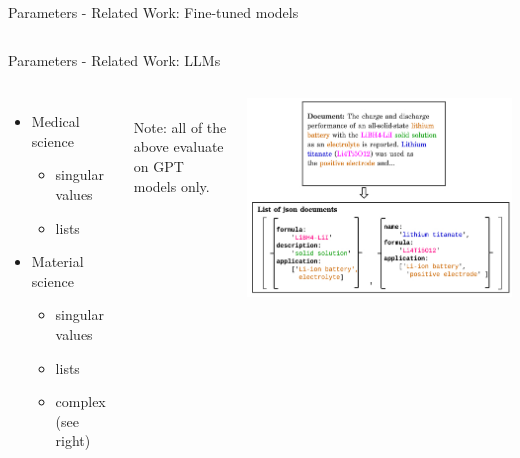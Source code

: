 \documentclass[en,16:9,smallfoot]{sdqbeamer}
\begin{document}
\begin{frame}{Parameters - Related Work: Fine-tuned models}
\begin{columns}
   \end{columns}
   \end{frame}

   \begin{frame}{Parameters - Related Work: LLMs}
   \begin{columns}
           \begin{itemize}
               \item Medical science~\cite{Agrawal2022}
                   \begin{itemize}
                       \item singular values
                       \item lists
                   \end{itemize}
               \item Material science~\cite{Xie2023,Polak2023,Dunn2022}
                   \begin{itemize}
                       \item singular values
                       \item lists
                       \item complex~\cite{Dunn2022} (see right)
                   \end{itemize}
           \end{itemize}

          ‌\\
          Note: all of the above evaluate\\
          on GPT models only.
           \begin{center}\includegraphics[width=\textwidth]{imgs/llm_sciext}\end{center}
   \end{columns}
   \end{frame}
\end{document}
